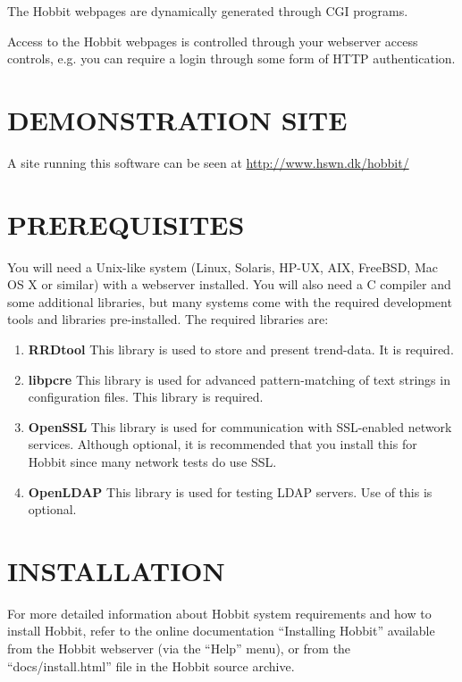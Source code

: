  The Hobbit webpages are dynamically generated through CGI programs. 


 Access to the Hobbit webpages is controlled through your webserver
 access controls, e.g. you can require a login through some form of
 HTTP authentication. 

 
\section{DEMONSTRATION SITE}
 A site running this software can be seen at \url{http://www.hswn.dk/hobbit/}

 
\section{PREREQUISITES}

 You will need a Unix-like system (Linux, Solaris, HP-UX, AIX,
 FreeBSD, Mac OS X or similar) with a webserver installed. You will
 also need a C compiler and some additional libraries, but many
 systems come with the required development tools and libraries
 pre-installed. The required libraries are: 


\begin{enumerate}

 \item \textbf{RRDtool}
 This library is used to store and present trend-data. It is required. 

 \item \textbf{libpcre}
 This library is used for advanced pattern-matching of text strings in
 configuration files. This library is required. 

 \item \textbf{OpenSSL}
 This library is used for communication with SSL-enabled network
 services. Although optional, it is recommended that you install this
 for Hobbit since many network tests do use SSL. 

 \item \textbf{OpenLDAP}
 This library is used for testing LDAP servers. Use of this is optional. 

\end{enumerate}

\section{INSTALLATION}
  For more detailed information about Hobbit system requirements and
  how to install Hobbit, refer to the online documentation
  ``Installing Hobbit'' available from the Hobbit webserver (via the
  ``Help'' menu), or from the ``docs/install.html'' file in the Hobbit
  source archive. 


